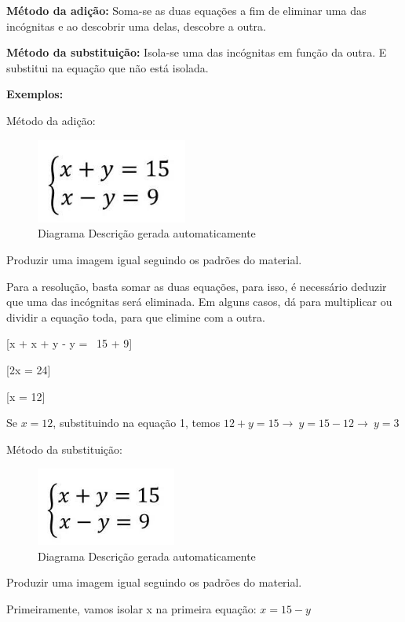 \textbf{Método da adição:} Soma-se as duas equações a fim de eliminar
uma das incógnitas e ao descobrir uma delas, descobre a outra.

\textbf{Método da substituição:} Isola-se uma das incógnitas em função
da outra. E substitui na equação que não está isolada.

\textbf{Exemplos:}

Método da adição:

\begin{figure}
\centering
\includegraphics[width=1.95952in,height=1.097in]{./imgSAEB_7_MAT/media/image18.png}
\caption{Diagrama Descrição gerada automaticamente}
\end{figure}

Produzir uma imagem igual seguindo os padrões do material.

Para a resolução, basta somar as duas equações, para isso, é necessário
deduzir que uma das incógnitas será eliminada. Em alguns casos, dá para
multiplicar ou dividir a equação toda, para que elimine com a outra.

[x + x + y - y = \ 15 + 9]

[2x = 24]

[x = 12]

Se \(x = 12\), substituindo na equação 1, temos
\(12 + y = 15 \rightarrow \ y = 15 - 12 \rightarrow \ y = 3\)

Método da substituição:

\begin{figure}
\centering
\includegraphics[width=1.81369in,height=1.01838in]{./imgSAEB_7_MAT/media/image18.png}
\caption{Diagrama Descrição gerada automaticamente}
\end{figure}

Produzir uma imagem igual seguindo os padrões do material.

Primeiramente, vamos isolar x na primeira equação: \(x = 15 - y\)

